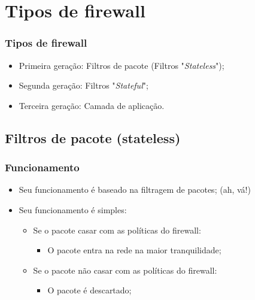 \section{Tipos de firewall}

\begin{frame}
	\frametitle{Tipos de firewall}
	\begin{itemize}
		\item Primeira geração: Filtros de pacote (Filtros "\textit{Stateless}");

		\item Segunda geração: Filtros "\textit{Stateful}";

		\item Terceira geração: Camada de aplicação.
	\end{itemize}
\end{frame}



\subsection{Filtros de pacote (stateless)}

\begin{frame}
	\frametitle{Funcionamento}
	\begin{itemize}
		\item Seu funcionamento é baseado na filtragem de pacotes; (ah, vá!)
		\item Seu funcionamento é simples:
		\begin{itemize}
			\item Se o pacote casar com as políticas do firewall:
				\begin{itemize}
					\item O pacote entra na rede na maior tranquilidade;
				\end{itemize}
			\item Se o pacote não casar com as políticas do firewall:
				\begin{itemize}
					\item O pacote é descartado;
				\end{itemize}
		\end{itemize}
	\end{itemize}
\end{frame}

